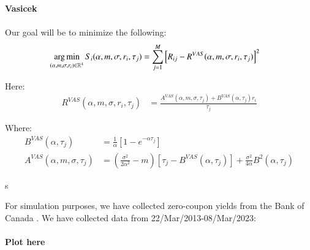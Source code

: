 \textbf{Vasicek}
\\~\\
Our goal will be to minimize the following: 
\begin{align*}
\operatorname*{arg\,min}\limits_{(\alpha, m, \sigma, r_{i}) \in \mathbb{R}^{4}}
S_{i}(\alpha, m, \sigma, r_{i}, \tau_{j}) 
&= 
\sum_{j=1}^{M}\left[
R_{ij} - R^{VAS}(\alpha, m, \sigma, r_{i}, \tau_{j})
\right]^{2}
\end{align*}

Here: 
\begin{align*}
R^{VAS}(\alpha, m, \sigma, r_{i}, \tau_{j})
&= 
\frac{
A^{VAS}(\alpha, m, \sigma, \tau_{j}) + B^{VAS}(\alpha, \tau_{j})r_{i}
}{
\tau_{j}
} 
\end{align*}

Where: 
\begin{align*}
B^{VAS}(\alpha, \tau_{j}) &= \frac{1}{\alpha}\left[
1 - e^{-\alpha \tau_{j}}
\right] \\ 
A^{VAS}(\alpha, m, \sigma, \tau_{j})
&= 
\left(
\frac{\sigma^{2}}{2\alpha^{2}} - m
\right)\left[
\tau_{j} - B^{VAS}(\alpha, \tau_{j})
\right]
+ \frac{\sigma^{2}}{4\alpha}B^{2}(\alpha, \tau_{j})
\end{align*}

\newpage 

s



\newpage 
For simulation purposes, we have collected zero-coupon yields from the Bank of Canada \cite{Canada_termyields}. We have collected data from 22/Mar/2013-08/Mar/2023: 
\\~\\ 
\textbf{Plot here}
\\~\\



